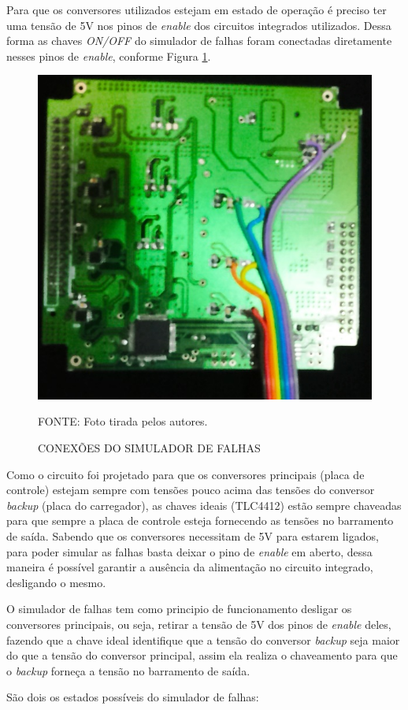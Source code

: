 \documentclass[
	12pt,				%
	openright,			%
	oneside,			%
	a4paper,			%
	english,			%
	french,				%
	spanish,			%
	brazil,				%
	oldfontcommands
	]{abntex2}
\begin{document}
	Para que os conversores utilizados estejam em estado de operação é preciso ter uma tensão de 5V nos pinos de \textit{enable} dos circuitos integrados utilizados. Dessa forma as chaves \textit{ON/OFF} do simulador de falhas foram conectadas diretamente nesses pinos de \textit{enable}, conforme Figura \ref{Fig_Simulador_Enable}.
		
	\begin{figure}[th]
		\caption{CONEXÕES DO SIMULADOR DE FALHAS}
		\label{Fig_Simulador_Enable}
		\centering
		\includegraphics[width=0.5\linewidth]{./figs/simulador_conexao}
			
		\begin{small}
			FONTE: Foto tirada pelos autores.
		\end{small}		
	\end{figure}
	
	Como o circuito foi projetado para que os conversores principais (placa de controle) estejam sempre com tensões pouco acima das tensões do conversor \textit{backup} (placa do carregador), as chaves ideais (TLC4412) estão sempre chaveadas para que sempre a placa de controle esteja fornecendo as tensões no barramento de saída. Sabendo que os conversores necessitam de 5V para estarem ligados, para poder simular as falhas basta deixar o pino de \textit{enable} em aberto, dessa maneira é possível garantir a ausência da alimentação no circuito integrado, desligando o mesmo.
	
	O simulador de falhas tem como principio de funcionamento desligar os conversores principais, ou seja, retirar a tensão de 5V dos pinos de \textit{enable} deles, fazendo que a chave ideal identifique que a tensão do conversor \textit{backup} seja maior do que a tensão do conversor principal, assim ela realiza o chaveamento para que o \textit{backup} forneça a tensão no barramento de saída.
	
	São dois os estados possíveis do simulador de falhas:
	
\end{document}
